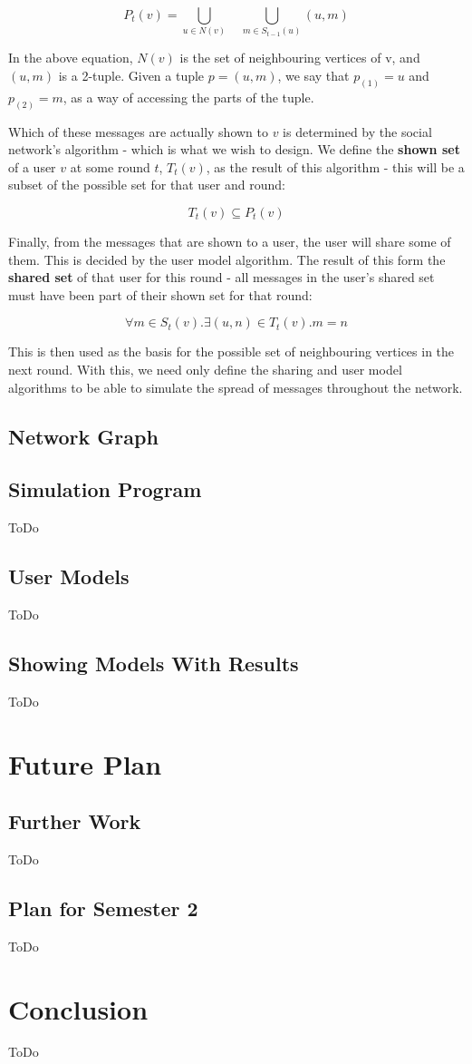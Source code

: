 \documentclass[bsc,frontabs,twoside,singlespacing,parskip,deptreport]{infthesis}     %
\begin{document}
\begin{equation}
P_{t}(v) = \bigcup_{u \in N(v)} \quad \bigcup_{m \in S_{t-1}(u)} (u, m)
\end{equation}

In the above equation, $N(v)$ is the set of neighbouring vertices of v, and $(u, m)$ is a 2-tuple. Given a tuple $p = (u, m)$, we say that $p_{(1)} = u$ and $p_{(2)} = m$, as a way of accessing the parts of the tuple.

Which of these messages are actually shown to $v$ is determined by the social network's algorithm - which is what we wish to design. We define the \textbf{shown set} of a user $v$ at some round $t$, $T_{t}(v)$, as the result of this algorithm - this will be a subset of the possible set for that user and round:

\begin{equation}
T_{t}(v) \subseteq P_{t}(v)
\end{equation}

Finally, from the messages that are shown to a user, the user will share some of them. This is decided by the user model algorithm. The result of this form the \textbf{shared set} of that user for this round - all messages in the user's shared set must have been part of their shown set for that round:

\begin{equation}
\forall m \in S_{t}(v) . \exists (u, n) \in T_{t}(v) . m = n
\end{equation}

This is then used as the basis for the possible set of neighbouring vertices in the next round. With this, we need only define the sharing and user model algorithms to be able to simulate the spread of messages throughout the network.


\section{Network Graph}


\section{Simulation Program}
ToDo

\section{User Models}
ToDo
\section{Showing Models With Results}
ToDo

\chapter{Future Plan}
\section{Further Work}
ToDo
\section{Plan for Semester 2}
ToDo
\chapter{Conclusion}
ToDo


\end{document}
